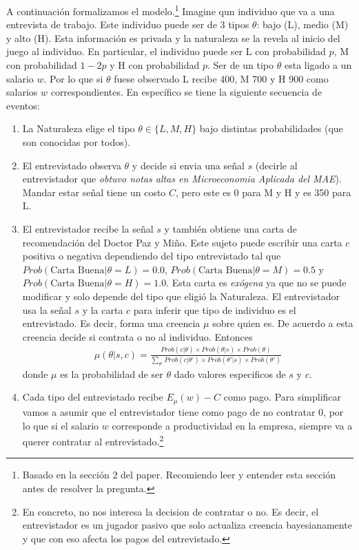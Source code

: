 \documentclass[11pt]{article}
\begin{document}
A continuaci\'on formalizamos el modelo.\footnote{Basado en la secci\'on 2 del paper. Recomiendo leer y entender esta secci\'on antes de resolver la pregunta.} Imagine qun individuo que va a una entrevista de trabajo. Este individuo puede ser de 3 tipos $\theta$: bajo (L), medio (M) y alto (H). Esta informaci\'on es privada y la naturaleza se la revela al inicio del juego al individuo. En particular, el individuo puede ser L con probabilidad $p$, M con probabilidad $1-2p$ y H con probabilidad $p$. Ser de un tipo $\theta$ esta ligado a un salario $w$. Por lo que si $\theta$ fuese observado L recibe 400, M 700 y H 900 como salarios $w$ correspondientes. En espec\'ifico se tiene la siguiente secuencia de eventos:
\begin{enumerate}
	\item La Naturaleza elige el tipo $\theta \in \{L,M,H\}$ bajo distintas probabilidades (que son conocidas por todos).
	\item El entrevistado observa $\theta$ y decide si envia una se\~nal $s$ (decirle al entrevistador que \textit{obtuvo notas altas en Microeconomia Aplicada del MAE}). Mandar estar se\~nal tiene un costo $C$, pero este es 0 para M y H y es 350 para L.
	\item El entrevistador recibe la se\~nal $s$ y tambi\'en obtiene una carta de recomendaci\'on del Doctor Paz y Mi\~no. Este sujeto puede escribir una carta $c$ positiva o negativa dependiendo del tipo entrevistado tal que $Prob(\text{Carta Buena}|\theta = L) = 0.0$, $Prob(\text{Carta Buena}|\theta = M) = 0.5$ y $Prob(\text{Carta Buena}|\theta = H) = 1.0$. Esta carta es \textit{ex\'ogena} ya que no se puede modificar y solo depende del tipo que eligi\'o la Naturaleza. El entrevistador usa la se\~nal $s$ y la carta $c$ para inferir que tipo de individuo es el entrevistado. Es decir, forma una creencia $\mu$ sobre quien es. De acuerdo a esta creencia decide si contrata o no al individuo. Entonces
	\begin{align*}
		\mu(\theta|s,c) = \frac{ Prob(c|\theta) \times Prob(\theta|s) \times Prob(\theta) }{ \sum_{\theta'} Prob(c|\theta') \times Prob(\theta'|s) \times Prob(\theta') }
	\end{align*} donde $\mu$ es la probabilidad de ser $\theta$ dado valores especificos de $s$ y $c$.
	\item Cada tipo del entrevistado recibe $E_{\mu}(w) - C$ como pago. Para simplificar vamos a asumir que el entrevistador tiene como pago de no contratar 0, por lo que si el salario $w$ corresponde a productividad en la empresa, siempre va a querer contratar al entrevistado.\footnote{En concreto, no nos interesa la decision de contratar o no. Es decir, el entrevistador es un jugador pasivo que solo actualiza creencia bayesianamente y que con eso afecta los pagos del entrevistado.}
\end{enumerate}
\end{document}
